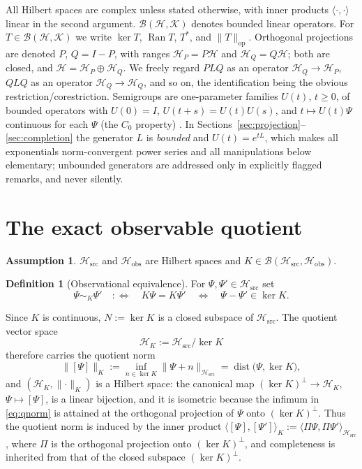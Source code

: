 \documentclass[11pt,reqno]{amsart}
\numberwithin{equation}{section}
\theoremstyle{plain}
\theoremstyle{definition}
\newtheorem{definition}[theorem]{Definition}
\newtheorem{assumption}[theorem]{Assumption}
\theoremstyle{remark}
\newcommand{\Hsrc}{\mathcal{H}_{\mathrm{src}}}
\newcommand{\Hobs}{\mathcal{H}_{\mathrm{obs}}}
\newcommand{\HK}{\mathcal{H}_{K}}
\newcommand{\HP}{\mathcal{H}_{P}}
\newcommand{\HQ}{\mathcal{H}_{Q}}
\newcommand{\Ran}{\operatorname{Ran}}
\newcommand{\inner}[2]{\langle #1 , #2 \rangle}
\begin{document}
All Hilbert spaces are complex unless stated otherwise, with inner products
$\inner{\cdot}{\cdot}$ linear in the second argument. $\mathcal{B}(\mathcal{H},\mathcal{K})$
denotes bounded linear operators. For $T\in\mathcal{B}(\mathcal{H},\mathcal{K})$ we write
$\ker T$, $\Ran T$, $T^{*}$, and $\lVert T\rVert_{\mathrm{op}}$. Orthogonal projections are
denoted $P$, $Q=I-P$, with ranges $\HP=P\mathcal{H}$ and $\HQ=Q\mathcal{H}$; both are
closed, and $\mathcal{H}=\HP\oplus\HQ$. We freely regard $PLQ$ as an operator
$\HQ\to\HP$, $QLQ$ as an operator $\HQ\to\HQ$, and so on, the identification being the
obvious restriction/corestriction. Semigroups are one-parameter families $U(t)$, $t\ge0$,
of bounded operators with $U(0)=I$, $U(t+s)=U(t)U(s)$, and $t\mapsto U(t)\Psi$ continuous
for each $\Psi$ (the $C_0$ property) \cite{EngelNagel,Pazy}. In
Sections~\ref{sec:projection}--\ref{sec:completion} the generator $L$ is \emph{bounded}
and $U(t)=e^{tL}$, which makes all exponentials norm-convergent power series and all
manipulations below elementary; unbounded generators are addressed only in explicitly
flagged remarks, and never silently.

\section{The exact observable quotient}
\label{sec:quotient}

\begin{assumption}
\label{ass:K}
$\Hsrc$ and $\Hobs$ are Hilbert spaces and $K\in\mathcal{B}(\Hsrc,\Hobs)$.
\end{assumption}

\begin{definition}[Observational equivalence]
\label{def:equiv}
For $\Psi,\Psi'\in\Hsrc$ set
\begin{equation}
\label{eq:equiv}
\Psi\sim_{K}\Psi'
\quad:\Longleftrightarrow\quad
K\Psi=K\Psi'
\quad\Longleftrightarrow\quad
\Psi-\Psi'\in\ker K .
\end{equation}
\end{definition}

Since $K$ is continuous, $N:=\ker K$ is a closed subspace of $\Hsrc$. The quotient vector
space
\begin{equation}
\label{eq:HK}
\HK:=\Hsrc/\ker K
\end{equation}
therefore carries the quotient norm
\begin{equation}
\label{eq:qnorm}
\bigl\lVert[\Psi]\bigr\rVert_{K}:=\inf_{n\in\ker K}\lVert\Psi+n\rVert_{\Hsrc}
=\operatorname{dist}\bigl(\Psi,\ker K\bigr),
\end{equation}
and $(\HK,\lVert\cdot\rVert_{K})$ is a Hilbert space: the canonical map
$(\ker K)^{\perp}\to\HK$, $\Psi\mapsto[\Psi]$, is a linear bijection, and it is isometric
because the infimum in \eqref{eq:qnorm} is attained at the orthogonal projection of $\Psi$
onto $(\ker K)^{\perp}$. Thus the quotient norm is induced by the inner product
$\inner{[\Psi]}{[\Psi']}_{K}:=\inner{\Pi\Psi}{\Pi\Psi'}_{\Hsrc}$, where $\Pi$ is the
orthogonal projection onto $(\ker K)^{\perp}$, and completeness is inherited from that of
the closed subspace $(\ker K)^{\perp}$.
\end{document}
